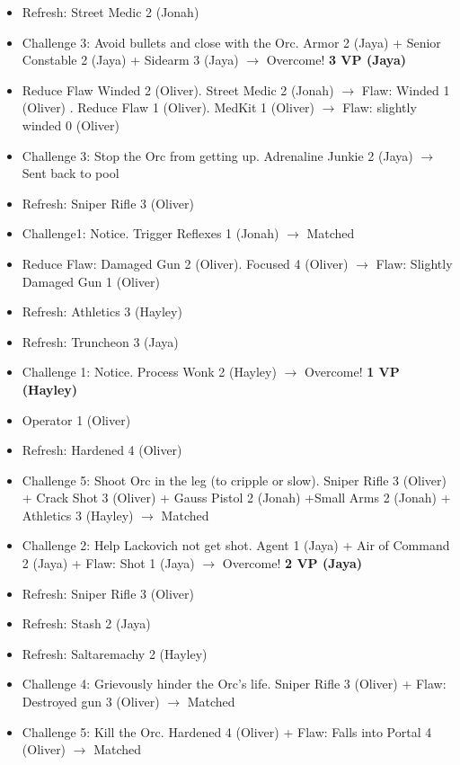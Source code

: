 \begin{itemize}[noitemsep,topsep=0pt]
\item Refresh: Street Medic 2 (Jonah)
\item Challenge 3: Avoid bullets and close with the Orc.  Armor 2 (Jaya) + Senior Constable 2 (Jaya) + Sidearm 3 (Jaya)  $\rightarrow$ Overcome! \textbf{3 VP (Jaya)}
\item Reduce Flaw Winded 2 (Oliver).  Street Medic 2 (Jonah) $\rightarrow$ Flaw: Winded 1 (Oliver) {\color[RGB]{255,0,0}. }  Reduce Flaw 1 (Oliver).  MedKit 1 (Oliver) $\rightarrow$  {\color[RGB]{255,0,0}Flaw: slightly winded 0 (Oliver)} 
\item Challenge 3: Stop the Orc from getting up.  Adrenaline Junkie 2 (Jaya) $\rightarrow$ Sent back to pool
\item Refresh: Sniper Rifle 3 (Oliver)
\item Challenge1:  Notice.  Trigger Reflexes 1 (Jonah) $\rightarrow$ Matched
\item Reduce Flaw: Damaged Gun 2 (Oliver).  Focused 4 (Oliver) $\rightarrow$  {\color[RGB]{255,0,0}Flaw: Slightly Damaged Gun 1 (Oliver)} 
\item Refresh: Athletics 3 (Hayley)
\item Refresh: Truncheon 3 (Jaya)
\item Challenge 1: Notice.  Process Wonk 2 (Hayley)   $\rightarrow$ Overcome! \textbf{1 VP (Hayley)}
\item Operator 1 (Oliver)
\item Refresh: Hardened 4 (Oliver)
\item Challenge 5: Shoot Orc in the leg (to cripple or slow).  Sniper Rifle 3 (Oliver) + Crack Shot 3 (Oliver) + Gauss Pistol 2 (Jonah) +Small Arms 2 (Jonah) + Athletics 3 (Hayley)  $\rightarrow$ Matched
\item Challenge 2: Help Lackovich not get shot.  Agent 1  (Jaya) + Air of Command 2  (Jaya) + Flaw: Shot 1 (Jaya)  $\rightarrow$ Overcome! \textbf{2 VP (Jaya)}
\item Refresh: Sniper Rifle 3 (Oliver)
\item Refresh: Stash 2 (Jaya)
\item Refresh: Saltaremachy 2 (Hayley)
\item Challenge 4: Grievously hinder the Orc's life.  Sniper Rifle 3 (Oliver) +  {\color[RGB]{255,0,0}Flaw: Destroyed gun 3 (Oliver) } $\rightarrow$ Matched
\item Challenge 5: Kill the Orc.  Hardened 4 (Oliver) +  {\color[RGB]{255,0,0}Flaw: Falls into Portal 4 (Oliver) } $\rightarrow$ Matched

\end{itemize}
